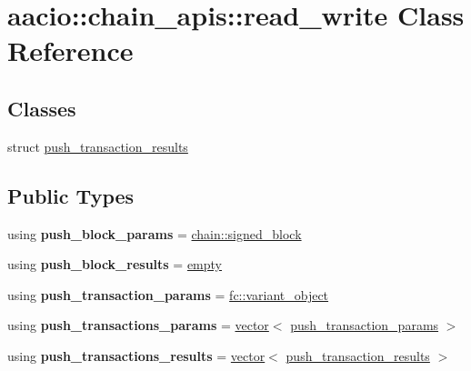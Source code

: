 \hypertarget{classaacio_1_1chain__apis_1_1read__write}{}\section{aacio\+:\+:chain\+\_\+apis\+:\+:read\+\_\+write Class Reference}
\label{classaacio_1_1chain__apis_1_1read__write}
\subsection*{Classes}
\begin{DoxyCompactItemize}
\item 
struct \mbox{\hyperlink{structaacio_1_1chain__apis_1_1read__write_1_1push__transaction__results}{push\+\_\+transaction\+\_\+results}}
\end{DoxyCompactItemize}
\subsection*{Public Types}
\begin{DoxyCompactItemize}
\item 
\mbox{\label{classaacio_1_1chain__apis_1_1read__write_a2e146afd68f9fcb0661b3cfc3ea8d0e1}} 
using {\bfseries push\+\_\+block\+\_\+params} = \mbox{\hyperlink{structaacio_1_1chain_1_1signed__block}{chain\+::signed\+\_\+block}}
\item 
\mbox{\label{classaacio_1_1chain__apis_1_1read__write_ab83230c9a7571580a37cd57fc879462e}} 
using {\bfseries push\+\_\+block\+\_\+results} = \mbox{\hyperlink{structaacio_1_1chain__apis_1_1empty}{empty}}
\item 
\mbox{\label{classaacio_1_1chain__apis_1_1read__write_acc0cc12a246d8f9ee38c651414dd6231}} 
using {\bfseries push\+\_\+transaction\+\_\+params} = \mbox{\hyperlink{classfc_1_1variant__object}{fc\+::variant\+\_\+object}}
\item 
\mbox{\label{classaacio_1_1chain__apis_1_1read__write_afbe87f8bcdef171022a974fbad2b1529}} 
using {\bfseries push\+\_\+transactions\+\_\+params} = \mbox{\hyperlink{classstd_1_1vector}{vector}}$<$ \mbox{\hyperlink{classfc_1_1variant__object}{push\+\_\+transaction\+\_\+params}} $>$
\item 
\mbox{\label{classaacio_1_1chain__apis_1_1read__write_a860cf9ef8531d252cb479160bcf2dbe3}} 
using {\bfseries push\+\_\+transactions\+\_\+results} = \mbox{\hyperlink{classstd_1_1vector}{vector}}$<$ \mbox{\hyperlink{structaacio_1_1chain__apis_1_1read__write_1_1push__transaction__results}{push\+\_\+transaction\+\_\+results}} $>$
\end{DoxyCompactItemize}
